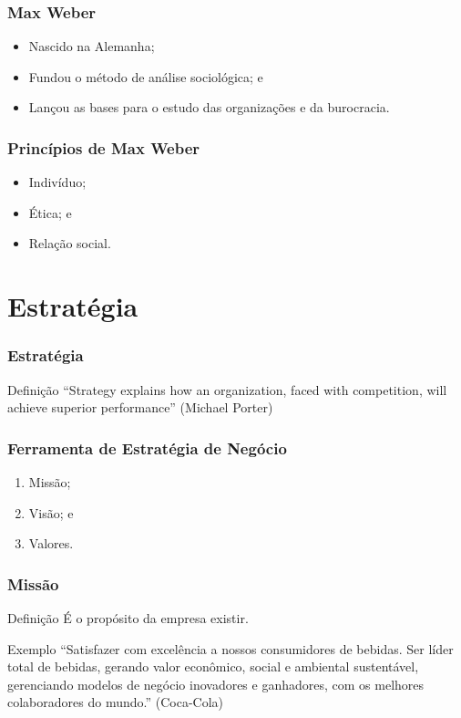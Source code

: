 \documentclass[aspectratio=169]{beamer}
\begin{document}
\begin{frame}
	\frametitle{Max Weber}

	\begin{itemize}
		\item Nascido na Alemanha;
		\item Fundou o método de análise sociológica; e
		\item Lan\c cou as bases para o estudo das organiza\c cões e da burocracia.
	\end{itemize}
\end{frame}

\begin{frame}
	\frametitle{Princípios de Max Weber}

	\begin{itemize}
		\item Indivíduo;
		\item Ética; e
		\item Rela\c cão social.
	\end{itemize}
\end{frame}

\section{Estratégia}

\begin{frame}
	\frametitle{Estratégia}

	\begin{block}{Defini\c cão}
		``Strategy explains how an organization, faced with competition, will achieve superior performance'' (Michael Porter)
	\end{block}
\end{frame}

\begin{frame}
	\frametitle{Ferramenta de Estratégia de Negócio}

	\begin{enumerate}
		\item Missão;
		\item Visão; e
		\item Valores.
	\end{enumerate}
\end{frame}

\begin{frame}
	\frametitle{Missão}

	\begin{block}{Defini\c cão}
		É o propósito da empresa existir.
	\end{block}\vfill
	
	\begin{exampleblock}{Exemplo}
		``Satisfazer com excelência a nossos consumidores de bebidas. Ser líder total de bebidas, gerando valor econômico, social e ambiental sustentável, gerenciando modelos de negócio inovadores e ganhadores, com os melhores colaboradores do mundo.'' (Coca-Cola)
	\end{exampleblock}
\end{frame}
\end{document}
